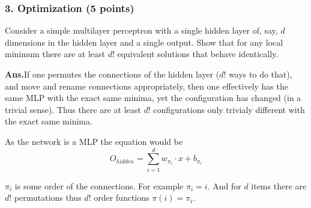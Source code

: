 \documentclass[12pt]{article}%
\begin{document}
\newpage


\subsubsection*{3. Optimization (5 points)}
Consider a simple multilayer perceptron with a single hidden layer of, say,  $d$  dimensions in the hidden layer and a single output. Show that for any local minimum there are at least  $d!$  equivalent solutions that behave identically.

\textbf{Ans.}If one permutes the connections of the hidden layer ($d!$ ways to do that), and move and rename connections appropriately, then one effectively has the same MLP with the exact same minima, yet the configuration has changed (in a trivial sense). Thus there are at least $d!$ configurations only trivialy different with the exact same minima.

As the network is a MLP the equation would be
$$O_{hidden}=\sum^d_{i=1}w_{\pi_i}\cdot x+b_{\pi_i}$$

$\pi_i$ is some order of the connections. For example $\pi_i = i$. And for $d$ items there are $d!$ permutations thus $d!$ order functions $\pi(i)=\pi_i$.
\end{document}
